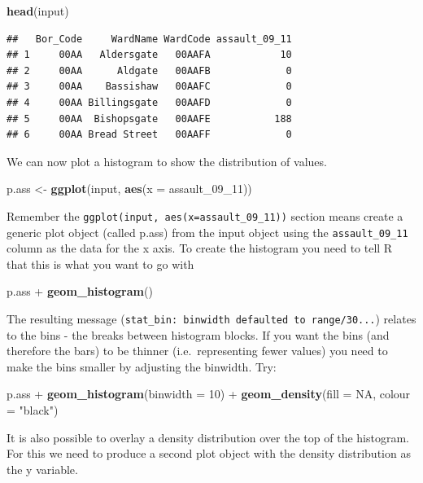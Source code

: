 \documentclass[]{article}
\newenvironment{Shaded}{}{}
\newcommand{\KeywordTok}[1]{\textcolor[rgb]{0.00,0.44,0.13}{\textbf{{#1}}}}
\newcommand{\DataTypeTok}[1]{\textcolor[rgb]{0.56,0.13,0.00}{{#1}}}
\newcommand{\DecValTok}[1]{\textcolor[rgb]{0.25,0.63,0.44}{{#1}}}
\newcommand{\StringTok}[1]{\textcolor[rgb]{0.25,0.44,0.63}{{#1}}}
\newcommand{\OtherTok}[1]{\textcolor[rgb]{0.00,0.44,0.13}{{#1}}}
\newcommand{\NormalTok}[1]{{#1}}
\begin{document}
\begin{Shaded}
\begin{Highlighting}[]
\KeywordTok{head}\NormalTok{(input)}
\end{Highlighting}
\end{Shaded}
\begin{verbatim}
##   Bor_Code     WardName WardCode assault_09_11
## 1     00AA   Aldersgate   00AAFA            10
## 2     00AA      Aldgate   00AAFB             0
## 3     00AA    Bassishaw   00AAFC             0
## 4     00AA Billingsgate   00AAFD             0
## 5     00AA  Bishopsgate   00AAFE           188
## 6     00AA Bread Street   00AAFF             0
\end{verbatim}
We can now plot a histogram to show the distribution of values.

\begin{Shaded}
\begin{Highlighting}[]
\NormalTok{p.ass <- }\KeywordTok{ggplot}\NormalTok{(input, }\KeywordTok{aes}\NormalTok{(}\DataTypeTok{x =} \NormalTok{assault_09_11))}
\end{Highlighting}
\end{Shaded}
Remember the \texttt{ggplot(input, aes(x=assault\_09\_11))} section
means create a generic plot object (called p.ass) from the input object
using the \texttt{assault\_09\_11} column as the data for the x axis. To
create the histogram you need to tell R that this is what you want to go
with

\begin{Shaded}
\begin{Highlighting}[]
\NormalTok{p.ass + }\KeywordTok{geom_histogram}\NormalTok{()}
\end{Highlighting}
\end{Shaded}
The resulting message
(\texttt{stat\_bin: binwidth defaulted to range/30...}) relates to the
bins - the breaks between histogram blocks. If you want the bins (and
therefore the bars) to be thinner (i.e.~representing fewer values) you
need to make the bins smaller by adjusting the binwidth. Try:

\begin{Shaded}
\begin{Highlighting}[]
\NormalTok{p.ass + }\KeywordTok{geom_histogram}\NormalTok{(}\DataTypeTok{binwidth =} \DecValTok{10}\NormalTok{) + }\KeywordTok{geom_density}\NormalTok{(}\DataTypeTok{fill =} \OtherTok{NA}\NormalTok{, }\DataTypeTok{colour =} \StringTok{"black"}\NormalTok{)}
\end{Highlighting}
\end{Shaded}
It is also possible to overlay a density distribution over the top of
the histogram. For this we need to produce a second plot object with the
density distribution as the y variable.
\end{document}

